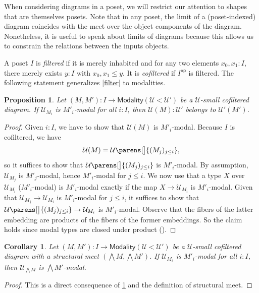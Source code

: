 \documentclass[10pt,a4paper,draft]{article}
\newcommand{\UU}{\mathcal{U}}%
\renewcommand{\~}{\widetilde}
\newcommand{\op}{\mathsf{op}}
\newcommand{\Modality}{\mathsf{Modality}}
\newcounter{diagram}
\DeclarePairedDelimiter\parens\lparen\rparen
\newtheorem{corollary}[theorem]{Corollary}
\newtheorem{proposition}[theorem]{Proposition}
\theoremstyle{definition}
\theoremstyle{remark} %
\begin{document}
When considering diagrams in a poset, we will restrict our attention to shapes that are themselves posets.
Note that in any poset, the limit of a (poset\hyp{}indexed) diagram coincides with the meet over the object components of the diagram.
Nonetheless, it is useful to speak about limits of diagrams because this allows us to constrain the relations between the inputs objects.

A poset $I$ is \emph{filtered} if it is merely inhabited and for any two elements $x_0, x_1 : I$, there merely exists $y : I$ with $x_0, x_1 \leq y$.
It is \emph{cofiltered} if $I^\op$ is filtered.
The following statement generalizes \cref{filter} to modalities.

\begin{proposition} \label{cofiltered-limit-subuniverses}
Let $(M, M') : I \to \Modality(\UU < \UU')$ be a $\UU$\hyp{}small cofiltered diagram.
If $\UU_{M_i}$ is $M'_i$\hyp{}modal for all $i : I$, then $\UU(M) : \UU'$ belongs to $\UU'(M')$.
\end{proposition}

\begin{proof}
Given $i : I$, we have to show that $\UU(M)$ is $M'_i$\hyp{}modal.
Because $I$ is cofiltered, we have
\[
\UU(M) = \UU\parens[\big]{(M_j)_{j \leq i}}
,\]
so it suffices to show that $\UU\parens[\big]{(M_j)_{j \leq i}}$ is $M'_i$\hyp{}modal.
By assumption, $\UU_{M_j}$ is $M'_j$\hyp{}modal, hence $M'_i$\hyp{}modal for $j \leq i$.
We now use that a type $X$ over $\UU_{M_i}$ ($M'_i$\hyp{}modal) is $M'_i$\hyp{}modal exactly if the map $X \to \UU_{M_i}$ is $M'_i$\hyp{}modal.
Given that $\UU_{M_j} \to \UU_{M_i}$ is $M'_i$\hyp{}modal for $j \leq i$, it suffices to show that $\UU\parens[\big]{(M_j)_{j \leq i}} \to \UU_{M_i}$ is $M'_i$\hyp{}modal.
Observe that the fibers of the latter embedding are products of the fibers of the former embeddings.
So the claim holds since modal types are closed under product (\cite[Lemma~1.26]{RijkeSS17}).
\end{proof}

\begin{corollary} \label{cofiltered-limit-universes-of-modals}
Let $(M, M') : I \to \Modality(\UU < \UU')$ be a $\UU$\hyp{}small cofiltered diagram with a structural meet $(\bigwedge M, \bigwedge M')$.
If $\UU_{M_i}$ is $M'_i$\hyp{}modal for all $i : I$, then $\UU_{\bigwedge M}$ is $\bigwedge M'$\hyp{}modal.
\end{corollary}

\begin{proof}
This is a direct consequence of \cref{cofiltered-limit-subuniverses} and the definition of structural meet.
\end{proof}
\end{document}
